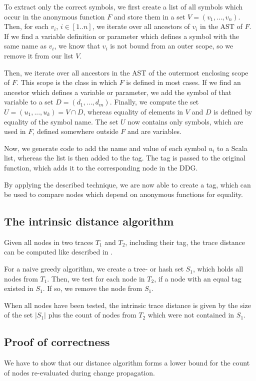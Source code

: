 To extract only the correct symbols, we first create a list of all symbols which occur in the anonymous function $F$ and store them in a set $V = (v_1, ..., v_n)$. Then, for each $v_i$, $i \in[1..n]$, we iterate over all ancestors of $v_i$ in the AST of $F$. If we find a variable definition or parameter which defines a symbol with the same name as $v_i$, we know that $v_i$ is not bound from an outer scope, so we remove it from our list $V$.

Then, we iterate over all ancestors in the AST of the outermost enclosing scope of $F$. This scope is the class in which $F$ is defined in most cases. If we find an ancestor which defines a variable or parameter, we add the symbol of that variable to a set $D = (d_1, ..., d_m)$. Finally, we compute the set $U = (u_1, ..., u_k) = V \cap D$, whereas equality of elements in $V$ and $D$ is defined by equality of the symbol name. The set $U$ now contains only symbols, which are used in $F$, defined somewhere outside $F$ and are variables. 

Now, we generate code to add the name and value of each symbol $u_i$ to a Scala list, whereas the list is then added to the tag. The tag is passed to the original function, which adds it to the corresponding node in the DDG.  

By applying the described technique, we are now able to create a tag, which can be used to compare nodes which depend on anonymous functions for equality. 

\subsection{The intrinsic distance algorithm}
Given all nodes in two traces $T_1$ and $T_2$, including their tag, the trace distance can be computed like described in \cite{Acar2005thesis}.  

For a naive greedy algorithm, we create a tree- or hash set $S_1$, which holds all nodes from $T_1$. Then, we test for each node in $T_2$, if a node with an equal tag existed in $S_1$. If so, we remove the node from $S_1$.

When all nodes have been tested, the intrinsic trace distance is given by the size of the set $|S_1|$ plus the count of nodes from $T_2$ which were not contained in $S_1$. 
\subsection{Proof of correctness}
We have to show that our distance algorithm forms a lower bound for the count of nodes re-evaluated during change propagation. 

